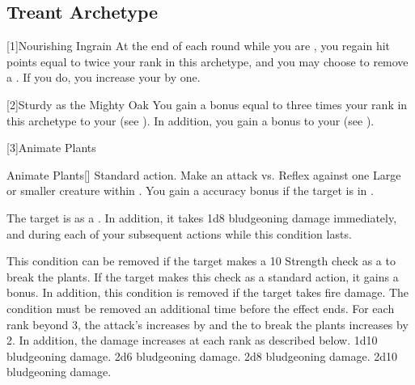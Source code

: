   \subsection{Treant Archetype}

    [1]{Nourishing Ingrain} At the end of each round while you are , you regain hit points equal to twice your rank in this archetype, and you may choose to remove a .
      If you do, you increase your  by one.

    [2]{Sturdy as the Mighty Oak} You gain a bonus equal to three times your rank in this archetype to your  (see ).
      In addition, you gain a  bonus to your  (see ).

    [3]{Animate Plants}
      \begin{activeability}{Animate Plants}[]
        \abilityusagetime Standard action.
        \rankline
        Make an attack vs. Reflex against one Large or smaller  creature within \medrange.
        You gain a  accuracy bonus if the target is in .

        \hit The target is \slowed as a .
        In addition, it takes 1d8 bludgeoning damage immediately, and during each of your subsequent actions while this condition lasts.

        This condition can be removed if the target makes a  10 Strength check as a  to break the plants.
        If the target makes this check as a standard action, it gains a  bonus.
        In addition, this condition is removed if the target takes fire damage.
        \crit The condition must be removed an additional time before the effect ends.
        \rankline
        For each rank beyond 3, the attack's  increases by  and the  to break the plants increases by 2.
        In addition, the damage increases at each rank as described below.
         1d10 bludgeoning damage.
         2d6 bludgeoning damage.
         2d8 bludgeoning damage.
         2d10 bludgeoning damage.
      \end{activeability}

